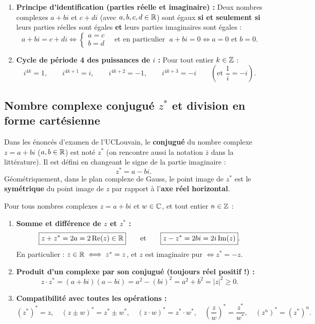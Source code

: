 \begin{theoreme}
\begin{enumerate}
    \item \textbf{Principe d'identification (parties réelle et imaginaire) :} Deux nombres complexes $a + bi$ et $c + di$ (avec $a,b,c,d \in \mathbb{R}$) sont égaux \textbf{si et seulement si} leurs parties réelles sont égales \textbf{et} leurs parties imaginaires sont égales :
    \[
        \boxed{a + bi = c + di \iff \begin{cases} a = c \\ b = d \end{cases}} \quad \text{et en particulier } \; a + bi = 0 \iff a = 0 \text{ et } b = 0.
    \]
    \item \textbf{Cycle de période 4 des puissances de $i$ :} Pour tout entier $k \in \mathbb{Z}$ :
    \[
        \boxed{i^{4k} = 1, \qquad i^{4k+1} = i, \qquad i^{4k+2} = -1, \qquad i^{4k+3} = -i \qquad \left(\text{et } \frac{1}{i} = -i\right)}.
    \]
\end{enumerate}
\end{theoreme}

\subsection{Nombre complexe conjugué $z^*$ et division en forme cartésienne}

\begin{definition}
Dans les énoncés d'examen de l'UCLouvain, le \textbf{conjugué} du nombre complexe $z = a + bi$ ($a, b \in \mathbb{R}$) est noté $z^*$ (on rencontre aussi la notation $\bar{z}$ dans la littérature). Il est défini en changeant le signe de la partie imaginaire :
\[
    \boxed{z^* = a - bi}.
\]
Géométriquement, dans le plan complexe de Gauss, le point image de $z^*$ est le \textbf{symétrique} du point image de $z$ par rapport à l'\textbf{axe réel horizontal}.
\end{definition}

\begin{theoreme}
Pour tous nombres complexes $z = a + bi$ et $w \in \mathbb{C}$, et tout entier $n \in \mathbb{Z}$ :
\begin{enumerate}
    \item \textbf{Somme et différence de $z$ et $z^*$ :}
    \[
        \boxed{z + z^* = 2a = 2\operatorname{Re}(z) \in \mathbb{R}} \qquad \text{et} \qquad \boxed{z - z^* = 2bi = 2i\operatorname{Im}(z)}.
    \]
    En particulier : $z \in \mathbb{R} \iff z^* = z$, et $z$ est imaginaire pur $\iff z^* = -z$.
    \item \textbf{Produit d'un complexe par son conjugué (toujours réel positif !) :}
    \[
        \boxed{z \cdot z^* = (a + bi)(a - bi) = a^2 - (bi)^2 = a^2 + b^2 = |z|^2 \ge 0}.
    \]
    \item \textbf{Compatibilité avec toutes les opérations :}
    \[
        (z^*)^* = z, \quad (z \pm w)^* = z^* \pm w^*, \quad (z \cdot w)^* = z^* \cdot w^*, \quad \left(\frac{z}{w}\right)^* = \frac{z^*}{w^*}, \quad (z^n)^* = (z^*)^n.
    \]
\end{enumerate}
\end{theoreme}

